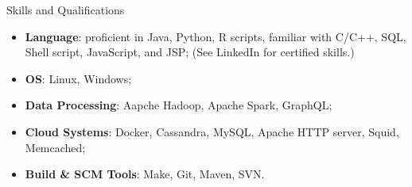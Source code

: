 \documentclass{professional} %
\newenvironment{myitemize}
{ \begin{itemize}[leftmargin=0.2em,label={}]
    \setlength{\itemsep}{0pt}
    \setlength{\parskip}{0pt}
    \setlength{\parsep}{0pt}     }
{ \end{itemize}                  }
\begin{document}
\begin{rSection}{Skills and Qualifications} 
\begin{myitemize}\setlength\itemsep{0.1em}
    \item \textbf{Language}: proficient in Java, Python, R scripts, familiar with C/C++, SQL, Shell script, JavaScript, and JSP; (See LinkedIn for certified skills.)
    \item \textbf{OS}: Linux, Windows; %
    \item \textbf{Data Processing}: Aapche Hadoop, Apache Spark, GraphQL;
    \item \textbf{Cloud Systems}: Docker, Cassandra, MySQL, Apache HTTP server, Squid, Memcached;
    \item \textbf{Build \& SCM Tools}: Make, Git, Maven, SVN.  %
\end{myitemize}


\end{rSection}
\end{document}
